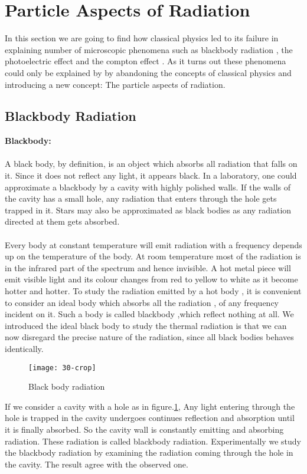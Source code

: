   \section{Particle Aspects of Radiation}
  In this section we are going to find how classical physics led to its failure in explaining number of microscopic phenomena such as blackbody radiation , the photoelectric effect and the compton effect . As it turns out these phenomena could only be explained by by abandoning the concepts of classical physics and introducing a new concept: The particle aspects of radiation.
  \subsection{Blackbody Radiation}
  {\textbf{\large Blackbody:}}\\\\
  A black body, by definition, is an object which absorbs all radiation that falls on it. Since it does not reflect any light, it appears black. In a laboratory, one could approximate a blackbody by a cavity with highly polished walls. If the walls of the cavity has a small hole, any radiation that enters through the hole gets trapped in it. Stars may also be approximated as black bodies as any radiation directed at them gets absorbed.\\\\
  Every  body at constant temperature will emit radiation with a frequency depends up on the temperature of the body. At room temperature most of the radiation is in the infrared part of the spectrum and hence invisible. A hot metal piece will emit visible light and its colour changes from red to yellow to white as it become hotter and hotter. To study the radiation emitted by a hot body , it is convenient to consider an ideal body  which absorbs all the radiation , of any frequency incident on it. Such a body is called blackbody  ,which reflect nothing at all. We introduced the ideal black body to study the thermal radiation is that we can now disregard the precise nature of the radiation, since all black bodies behaves identically.\\
  \begin{figure}[H]
  	\centering
  	\texttt{[image: 30-crop]}
  	\caption{Black body radiation}
  	\label{Black body radiation}
  \end{figure}
  If we consider a cavity with a hole as in figure.\ref{Black body radiation}, Any light entering through the hole is trapped in the cavity undergoes continues reflection and absorption until it is finally absorbed. So the cavity wall is constantly emitting and absorbing radiation. These radiation is called blackbody radiation. Experimentally we study the blackbody radiation by examining the radiation coming through the hole in the cavity. The result agree with the observed one.
